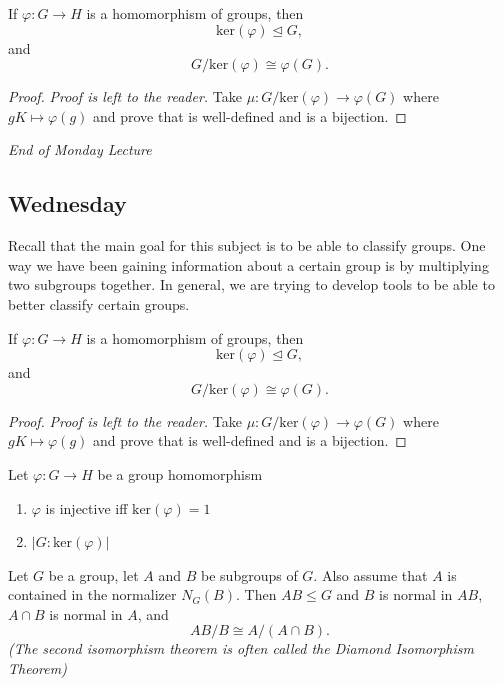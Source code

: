 \begin{theorem}
    If \( \varphi : G \to H  \) is a homomorphism of groups, then 
    \[  \text{ker}(\varphi) \trianglelefteq G, \]
    and
    \[  G / \text{ker}(\varphi) \cong \varphi(G). \]
\end{theorem}
\begin{proof}
\textit{Proof is left to the reader.} Take \( \mu: G / \text{ker}(\varphi) \to \varphi(G) \) where \( g K \mapsto \varphi(g) \) and prove that is well-defined and is a bijection. 
\end{proof}

\begin{center}
    \textit{End of Monday Lecture} 
\end{center}
\subsection{Wednesday}

Recall that the main goal for this subject is to be able to classify groups. One way we have been gaining information about a certain group is by multiplying two subgroups together. In general, we are trying to develop tools to be able to better classify certain groups.

\begin{theorem}
    If \( \varphi : G \to H  \) is a homomorphism of groups, then 
    \[  \text{ker}(\varphi) \trianglelefteq G, \]
    and
    \[  G / \text{ker}(\varphi) \cong \varphi(G). \]
\end{theorem}
\begin{proof}
\textit{Proof is left to the reader.} Take \( \mu: G / \text{ker}(\varphi) \to \varphi(G) \) where \( g K \mapsto \varphi(g) \) and prove that is well-defined and is a bijection. 
\end{proof}

\begin{corollary}
   Let \( \varphi : G \to H  \) be a group homomorphism 
   \begin{enumerate}
       \item[(1)] \( \varphi  \) is injective iff \( \text{ker}(\varphi) = 1  \) 
        \item[(2)] \( |  G : \text{ker}(\varphi) |  \)
   \end{enumerate}
\end{corollary}

\begin{theorem}
Let \( G  \) be a group, let \( A  \) and \( B  \) be subgroups of \( G  \). Also assume that \( A  \) is contained in the normalizer \( {N}_{G}(B) \). Then \( AB \leq G  \) and    \( B  \) is normal in \( AB  \), \( A \cap B  \) is normal in \( A  \), and 
\[  A B / B \cong A / (A \cap B). \]
\textit{(The second isomorphism theorem is often called the Diamond Isomorphism Theorem)} 
\end{theorem}

